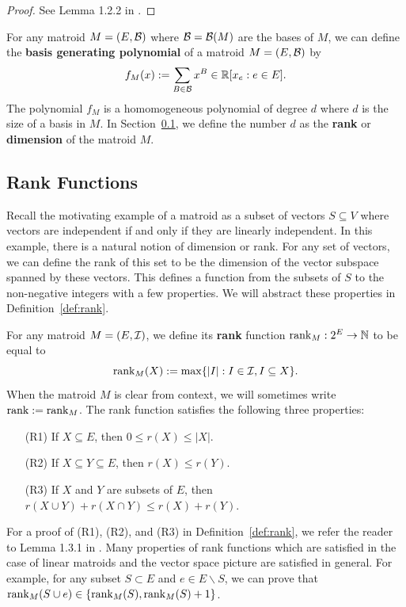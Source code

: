 \documentclass{puthesis-UG}
\begin{document}
\begin{proof}
	See Lemma 1.2.2 in \cite{10.5555/1197093}. 
\end{proof}

For any matroid $M = (E, \mathcal{B})$ where $\mathcal{B} = \mathcal{B}(M)$ are the bases of $M$, we can define the \textbf{basis generating polynomial} of a matroid $M = (E, \mathcal{B})$ by
\[
	f_M (x) := \sum_{B \in \mathcal{B}} x^B \in \mathbb{R}[x_e : e \in E].
\]
The polynomial $f_M$ is a homomogeneous polynomial of degree $d$ where $d$ is the size of a basis in $M$. In Section~\ref{sec:rank}, we define the number $d$ as the \textbf{rank} or \textbf{dimension} of the matroid $M$. 

\subsection{Rank Functions} \label{sec:rank}

Recall the motivating example of a matroid as a subset of vectors $S \subseteq V$ where vectors are independent if and only if they are linearly independent. In this example, there is a natural notion of dimension or rank. For any set of vectors, we can define the rank of this set to be the dimension of the vector subspace spanned by these vectors. This defines a function from the subsets of $S$ to the non-negative integers with a few properties. We will abstract these properties in Definition~\ref{def:rank}. 

\begin{defn} \label{def:rank}
	For any matroid $M = (E, \mathcal{I})$, we define its \textbf{rank} function $\operatorname{rank}_M : 2^E \to \mathbb{N}$ to be equal to
	\[
		\operatorname{rank}_M(X) := \max \{|I| : I \in \mathcal{I}, I \subseteq X\}.
	\]
	When the matroid $M$ is clear from context, we will sometimes write $\operatorname{rank} := \operatorname{rank}_M$. The rank function satisfies the following three properties:
	\begin{enumerate}
		\item[(R1)] If $X \subseteq E$, then $0 \leq r(X) \leq |X|$. 
		\item[(R2)] If $X \subseteq Y \subseteq E$, then $r(X) \leq r(Y)$. 
		\item[(R3)] If $X$ and $Y$ are subsets of $E$, then $r(X \cup Y) + r(X \cap Y) \leq r(X) + r(Y)$.
	\end{enumerate}
\end{defn}

For a proof of (R1), (R2), and (R3) in Definition~\ref{def:rank}, we refer the reader to Lemma 1.3.1 in \cite{10.5555/1197093}. Many properties of rank functions which are satisfied in the case of linear matroids and the vector space picture are satisfied in general. For example, for any subset $S \subset E$ and $e \in E \backslash S$, we can prove that $\operatorname{rank}_M(S \cup e) \in \{\operatorname{rank}_M(S), \operatorname{rank}_M(S) + 1\}$. 
\end{document}

